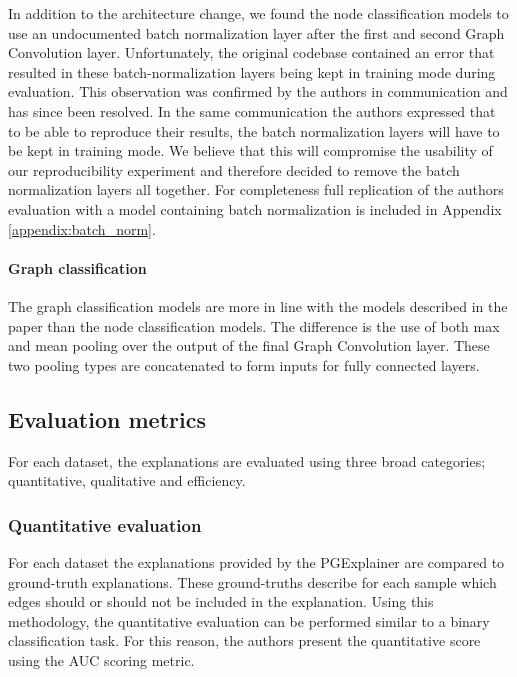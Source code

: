 In addition to the architecture change, we found the node classification models to use an undocumented batch normalization layer after the first and second Graph Convolution layer. Unfortunately, the original codebase contained an error that resulted in these batch-normalization layers being kept in training mode during evaluation. This observation was confirmed by the authors in communication and has since been resolved. In the same communication the authors expressed that to be able to reproduce their results, the batch normalization layers will have to be kept in training mode. We believe that this will compromise the usability of our reproducibility experiment and therefore decided to remove the batch normalization layers all together. For completeness full replication of the authors evaluation with a model containing batch normalization is included in Appendix \ref{appendix:batch_norm}.

\paragraph{Graph classification}
The graph classification models are more in line with the models described in the paper than the node classification models. The difference is the use of both max and mean pooling over the output of the final Graph Convolution layer. These two pooling types are concatenated to form inputs for fully connected layers.  

\subsection{Evaluation metrics}

For each dataset, the explanations are evaluated using three broad categories; quantitative, qualitative and efficiency.

\subsubsection{Quantitative evaluation}
For each dataset the explanations provided by the PGExplainer are compared to ground-truth explanations. These ground-truths describe for each sample which edges should or should not be included in the explanation. Using this methodology, the quantitative evaluation can be performed similar to a binary classification task. For this reason, the authors present the quantitative score using the AUC scoring metric. 

